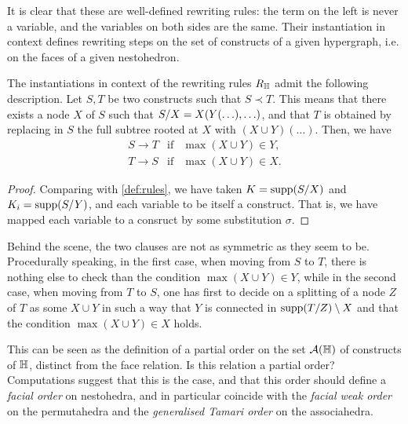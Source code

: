 It is clear that these are well-defined rewriting rules: the term on the left is never a variable, and the variables on both sides are the same.
Their instantiation in context defines rewriting steps on the set of constructs of a given hypergraph, i.e. on the faces of a given nestohedron.

\begin{lemma} 
  The instantiations in context of the rewriting rules $R_{\mathbb H}$ admit the following description.
  Let $S,T$ be two constructs such that $S \prec T$. 
  This means that there exists a node $X$ of $S$ such that $S/X=X(Y(\ldots),\ldots)$, and that $T$ is obtained by replacing in $S$ the full subtree rooted at $X$ with $(X\cup Y)(\ldots)$. 
  Then, we have
  $$\begin{array}{lll}
    S \to T &  \mathrm{if} & \max(X\cup Y)\in Y, \\
    T \to S & \mathrm{if} & \max(X\cup Y)\in X.
  \end{array}$$
\end{lemma} 

\begin{proof}
  Comparing with \cref{def:rules}, we have taken $K=\operatorname{supp}(S/X)$ and $K_i=\operatorname{supp}(S/Y)$, and each variable to be itself a construct. 
  That is, we have mapped each variable to a consruct by some substitution $\sigma$.
\end{proof}

\begin{rem}
  Behind the scene, the two clauses are not as symmetric as they seem to be. 
  Procedurally speaking, in the first case, when moving from $S$ to $T$, there is nothing else to check than the condition $\max(X\cup Y)\in Y$, while in the second case, when moving from $T$ to $S$, one has first to decide on a splitting of a node $Z$ of $T$ as some $X\cup Y$ in such a way that $Y$ is connected in $\operatorname{supp}(T/Z)\setminus X$ and  that  the condition $\max(X\cup Y)\in X$ holds.
\end{rem}

\begin{rem}
  This can be seen as the definition of a partial order on the set $\mathcal{A}({\mathbb H})$ of constructs of ${\mathbb H}$, distinct from the face relation. 
  Is this relation a partial order?
  Computations suggest that this is the case, and that this order should define a \emph{facial order} on nestohedra, and in particular coincide with the \emph{facial weak order} \cite{KrobLatapyNovelliPhanSchwer,PalaciosRonco,DermenjianHohlwegPilaud} on the permutahedra and the \emph{generalised Tamari order} \cite{Ronco12} on the associahedra.
\end{rem}


